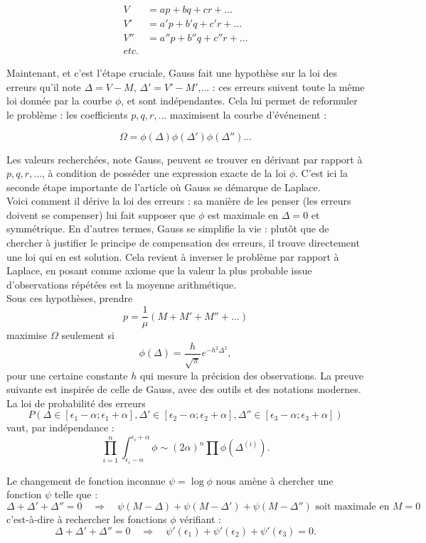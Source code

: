 \documentclass{article}
\begin{document}
\begin{align*}
V & = ap+bq+cr+...\\
V' & = a'p+b'q+c'r+...\\
V'' & = a''p+b''q+c''r+...\\
etc.
\end{align*}

Maintenant, et c'est l'étape cruciale, Gauss fait une hypothèse sur la loi des erreurs qu'il note $\Delta=V-M$, $\Delta'=V'-M'$,... : ces erreurs suivent toute la même loi donnée par la courbe $\phi$, et sont indépendantes. Cela lui permet de reformuler le problème : les coefficients $p,q,r,...$ maximisent la courbe d'événement :

\[\Omega = \phi(\Delta)\phi(\Delta')\phi(\Delta'')...\]

Les valeurs recherchées, note Gauss, peuvent se trouver en dérivant par rapport à $p,q,r,...$, à condition de posséder une expression exacte de la loi $\phi$. C'est ici la seconde étape importante de l'article où Gauss se démarque de Laplace.\\

Voici comment il dérive la loi des erreurs :  sa manière de les penser (les erreurs doivent se compenser) lui fait supposer que $\phi$ est maximale en $\Delta=0$ et symmétrique.  En d'autres termes, Gauss se simplifie la vie : plutôt que de chercher à justifier le principe de compensation des erreurs, il trouve directement une loi qui en est solution. Cela revient à inverser le problème par rapport à Laplace, en posant comme axiome que la valeur la plus probable issue d'observations répétées est la moyenne arithmétique.\\

Sous ces hypothèses, prendre
\[p=\frac{1}{\mu}(M+M'+M''+ ...)\]
maximise $\Omega$ seulement si 
\[\phi(\Delta)= \frac{h}{\sqrt \pi} e^{-h^2\Delta^2},\]
pour une certaine constante $h$ qui mesure la précision des observations. La preuve suivante est inspirée de celle de Gauss, avec des outils et des notations modernes.\\

La loi de probabilité des erreurs 
\[P(\Delta \in [\epsilon_1-\alpha;\epsilon_1+\alpha],\Delta' \in [\epsilon_2-\alpha;\epsilon_2+\alpha],\Delta'' \in [\epsilon_3-\alpha;\epsilon_3+\alpha])\]
vaut, par indépendance :
\[\prod_{i=1}^n \int_{\epsilon_i-\alpha}^{\epsilon_i+\alpha} \phi \sim (2\alpha)^n \prod \phi (\Delta^{(i)}).\]

Le changement de fonction inconnue $\psi =\log \phi$ nous amène à chercher une fonction $\psi$ telle que :
\[\Delta+\Delta'+\Delta''=0 \quad \Rightarrow \quad \psi(M-\Delta)+\psi(M-\Delta')+\psi(M-\Delta'') \text{ soit maximale en } M=0\]
c'est-à-dire à rechercher les fonctions $\phi$ vérifiant :
\[\Delta+\Delta'+\Delta''=0 \quad \Rightarrow \quad \psi'(\epsilon_1)+\psi'(\epsilon_2)+\psi'(\epsilon_3)=0.\]
\end{document}
